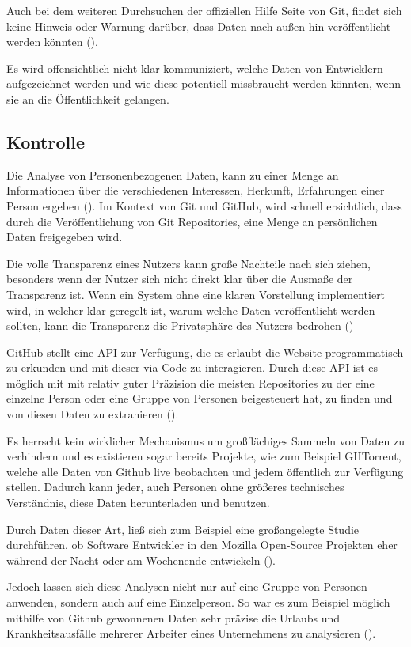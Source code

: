 \documentclass[12pt,a4paper]{article}
\begin{document}
Auch bei dem weiteren Durchsuchen der offiziellen Hilfe Seite von Git, findet sich keine Hinweis oder Warnung darüber, dass Daten nach außen hin veröffentlicht werden könnten (\cite{online:manpage}).

Es wird offensichtlich nicht klar kommuniziert, welche Daten von Entwicklern aufgezeichnet werden und wie diese potentiell missbraucht werden könnten, wenn sie an die Öffentlichkeit gelangen.


\subsection{Kontrolle}
Die Analyse von Personenbezogenen Daten, kann zu einer Menge an Informationen über die verschiedenen Interessen, Herkunft, Erfahrungen einer Person ergeben (\cite[p.~4-5]{article:corporate}).
Im Kontext von Git und GitHub, wird schnell ersichtlich, dass durch die Veröffentlichung von Git Repositories, eine Menge an persönlichen Daten freigegeben wird.

Die volle Transparenz eines Nutzers kann große Nachteile nach sich ziehen, besonders wenn der Nutzer sich nicht direkt klar über die Ausmaße der Transparenz ist.
Wenn ein System ohne eine klaren Vorstellung implementiert wird, in welcher klar geregelt ist, warum welche Daten veröffentlicht werden sollten, kann die Transparenz die Privatsphäre des Nutzers bedrohen (\cite[p.~6]{article:seeing-knowing})

GitHub stellt eine API zur Verfügung, die es erlaubt die Website programmatisch zu erkunden und mit dieser via Code zu interagieren.
Durch diese API ist es möglich mit mit relativ guter Präzision die meisten Repositories zu der eine einzelne Person oder eine Gruppe von Personen beigesteuert hat, zu finden und von diesen Daten zu extrahieren (\cite[p.~14-16]{thes:thesis}).

Es herrscht kein wirklicher Mechanismus um großflächiges Sammeln von Daten zu verhindern und es existieren sogar bereits Projekte, wie zum Beispiel GHTorrent, welche alle Daten von Github live beobachten und jedem öffentlich zur Verfügung stellen.
Dadurch kann jeder, auch Personen ohne größeres technisches Verständnis, diese Daten herunterladen und benutzen.

Durch Daten dieser Art, ließ sich zum Beispiel eine großangelegte Studie durchführen, ob Software Entwickler in den Mozilla Open-Source Projekten eher während der Nacht oder am Wochenende entwickeln (\cite{inproc:work-night}).

Jedoch lassen sich diese Analysen nicht nur auf eine Gruppe von Personen anwenden, sondern auch auf eine Einzelperson.
So war es zum Beispiel möglich mithilfe von Github gewonnenen Daten sehr präzise die Urlaubs und Krankheitsausfälle mehrerer Arbeiter eines Unternehmens zu analysieren (\cite[p.~37-39]{thes:thesis}).
\end{document}
